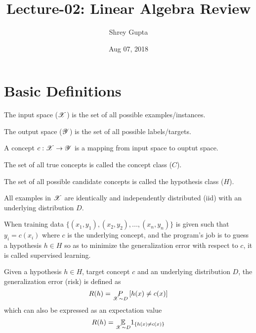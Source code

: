 \documentclass[a4paper,english,12pt]{article}
\title{Lecture-02: Linear Algebra Review}
\date{Aug 07, 2018}
\author{Shrey Gupta}
\begin{document}
\maketitle


\section{Basic Definitions}

\begin{defn}
The input space ($\mathscr{X}$) is the set of all possible examples/instances.
\end{defn}

\begin{defn}
The output space ($\mathscr{Y}$) is the set of all possible labels/targets.
\end{defn}

\begin{defn}
A concept $c:\mathscr{X} \rightarrow \mathscr{Y}$ is a mapping from input space to ouptut space.
\end{defn}

\begin{defn}
The set of all true concepts is called the concept class ($C$).
\end{defn}

\begin{defn}
The set of all possible candidate concepts is called the hypothesis class ($H$).
\end{defn}

\begin{assum}
All examples in $\mathscr{X}$ are identically and independently distributed (iid) with an underlying distribution $D$.
\end{assum}

\begin{defn}
When training data $\{ (x_1, y_1), (x_2, y_2), ... , (x_n, y_n) \}$ is given such that $y_i = c(x_i)$ where $c$ is the underlying concept, and the program's job is to guess a hypothesis $h \in H$ so as to minimize the generalization error with respect to $c$, it is called supervised learning.
\end{defn}

\begin{defn}
Given a hypothesis $h\in H$, target concept $c$ and an underlying distribution $D$, the generalization error (risk) is defined as
$$ R(h) = \underset{\mathscr{X} \sim D} P \left[ h(x) \neq c(x) \right] $$
which can also be expressed as an expectation value
$$ R(h) = \underset{\mathscr{X} \sim D}{\mathbb{E}} 1_{ \left\{ h(x) \neq c(x) \right\}} $$
\end{defn}
\end{document}
